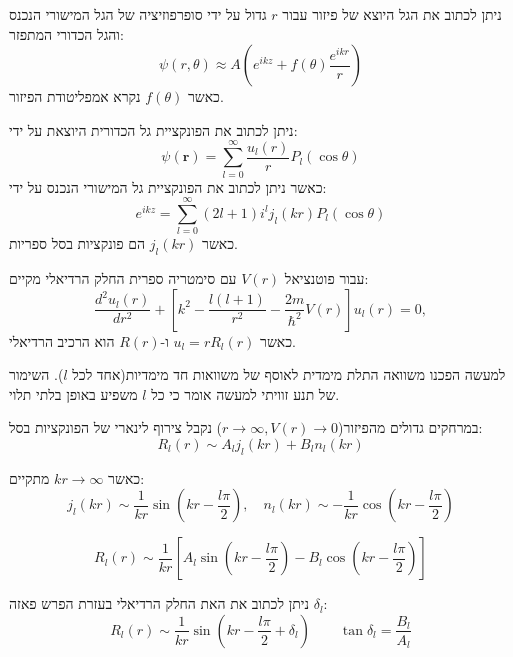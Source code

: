\documentclass{tstextbook}
\begin{document}
\begin{reminder}
ניתן לכתוב את הגל היוצא של פיזור עבור \(r\) גדול על ידי סופרפוזיציה של הגל המישורי הנכנס והגל הכדורי המתפזר:
$$\psi(r,\theta)\approx A\left(e^{i k z}+f(\theta)\frac{e^{i k r}}{r}\right)$$
כאשר \(f\left( \theta \right)\) נקרא אמפליטודת הפיזור.

\end{reminder}
\begin{proposition}
ניתן לכתוב את הפונקציית גל הכדורית היוצאת על ידי:
$$\psi(\mathbf{r})=\sum_{l=0}^{\infty}{\frac{u_{l}(r)}{r}}P_{l}(\cos\theta)$$
כאשר ניתן לכתוב את הפונקציית גל המישורי הנכנס על ידי:
$$e^{i k z}=\sum_{l=0}^{\infty}(2l+1)i^{l}j_{l}(k r)P_{l}(\cos\theta)$$
כאשר \(j_{l}(kr)\) הם פונקציות בסל ספריות.

\end{proposition}
\begin{proposition}
עבור פוטנציאל \(V(r)\) עם סימטריה ספרית החלק הרדיאלי מקיים:
$$\frac{d^{2}u_{l}(r)}{d r^{2}}+\left[k^{2}-\frac{l(l+1)}{r^{2}}-\frac{2m}{\hbar^{2}}V(r)\right]u_{l}(r)=0,$$
כאשר \(u_{l}=rR_{l}(r)\) ו-\(R(r)\) הוא הרכיב הרדיאלי.

\end{proposition}
\begin{remark}
למעשה הפכנו משוואה התלת מימדית לאוסף של משוואות חד מימדיות(אחד לכל \(l\)). השימור של תנע זוויתי למעשה אומר כי כל \(l\) משפיע באופן בלתי תלוי.

\end{remark}
\begin{proposition}
במרחקים גדולים מהפיזור(\(r\to \infty,V(r)\to 0\)) נקבל צירוף לינארי של הפונקציות בסל:
$$R_{l}(r)\sim A_{l}j_{l}(k r)+B_{l}n_{l}(k r)$$

\end{proposition}
\begin{lemma}
כאשר \(kr\to \infty\) מתקיים:
$$j_{l}(k r)\sim\frac{1}{k r}\sin\left(k r-\frac{l\pi}{2}\right),\quad n_{l}(k r)\sim-\frac{1}{k r}\cos\left(k r-\frac{l\pi}{2}\right)$$

\end{lemma}
\begin{proposition}
$$R_{l}(r)\sim\frac{1}{k r}\left[A_{l}\sin\left(k r-\frac{l\pi}{2}\right)-B_{l}\cos\left(k r-\frac{l\pi}{2}\right)\right]$$

\end{proposition}
\begin{corollary}
ניתן לכתוב את האת החלק הרדיאלי בעזרת הפרש פאזה \(\delta_{l}\):
$$R_{l}(r)\sim\frac{1}{k r}\sin\left(k r-\frac{l\pi}{2}+\delta_{l}\right) \qquad \tan\delta_{l}=\frac{B_{l}}{A_{l}}$$

\end{corollary}
\end{document}
